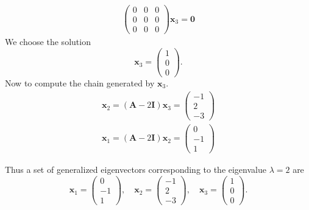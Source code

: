 \begin{Example}
\begin{gather*}
    \begin{pmatrix}
      0 & 0 & 0 \\
      0 & 0 & 0 \\
      0 & 0 & 0
    \end{pmatrix}
    \mathbf{x}_{3} = \mathbf{0}
  \end{gather*}
  We choose the solution
  \[
  \mathbf{x}_{3} = 
  \begin{pmatrix}
    1 \\
    0 \\
    0
  \end{pmatrix}.
  \]
  Now to compute the chain generated by $\mathbf{x}_{3}$.
  \begin{gather*}
    \mathbf{x}_{2} = (\mathbf{A} - 2 \mathbf{I}) \mathbf{x}_{3} = 
    \begin{pmatrix}
      -1 \\
      2 \\
      -3
    \end{pmatrix} \\
    \mathbf{x}_{1} = (\mathbf{A} - 2 \mathbf{I}) \mathbf{x}_{2} = 
    \begin{pmatrix}
      0 \\
      -1 \\
      1
    \end{pmatrix}
  \end{gather*}

  Thus a set of generalized eigenvectors corresponding to the eigenvalue 
  $\lambda = 2$ are
  \[
  \boxed{
    \mathbf{x}_{1} =
    \begin{pmatrix}
      0 \\
      -1 \\
      1
    \end{pmatrix},
    \quad
    \mathbf{x}_{2} =
    \begin{pmatrix}
      -1 \\
      2 \\
      -3
    \end{pmatrix},
    \quad
    \mathbf{x}_{3} = 
    \begin{pmatrix}
      1 \\
      0 \\
      0
    \end{pmatrix}.
    }
  \]
\end{Example}





